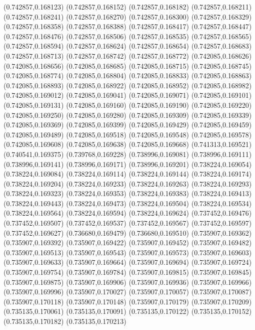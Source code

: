 (0.742857,0.168123)
(0.742857,0.168152)
(0.742857,0.168182)
(0.742857,0.168211)
(0.742857,0.168241)
(0.742857,0.168270)
(0.742857,0.168300)
(0.742857,0.168329)
(0.742857,0.168358)
(0.742857,0.168388)
(0.742857,0.168417)
(0.742857,0.168447)
(0.742857,0.168476)
(0.742857,0.168506)
(0.742857,0.168535)
(0.742857,0.168565)
(0.742857,0.168594)
(0.742857,0.168624)
(0.742857,0.168654)
(0.742857,0.168683)
(0.742857,0.168713)
(0.742857,0.168742)
(0.742857,0.168772)
(0.742085,0.168626)
(0.742085,0.168656)
(0.742085,0.168685)
(0.742085,0.168715)
(0.742085,0.168745)
(0.742085,0.168774)
(0.742085,0.168804)
(0.742085,0.168833)
(0.742085,0.168863)
(0.742085,0.168893)
(0.742085,0.168922)
(0.742085,0.168952)
(0.742085,0.168982)
(0.742085,0.169012)
(0.742085,0.169041)
(0.742085,0.169071)
(0.742085,0.169101)
(0.742085,0.169131)
(0.742085,0.169160)
(0.742085,0.169190)
(0.742085,0.169220)
(0.742085,0.169250)
(0.742085,0.169280)
(0.742085,0.169309)
(0.742085,0.169339)
(0.742085,0.169369)
(0.742085,0.169399)
(0.742085,0.169429)
(0.742085,0.169459)
(0.742085,0.169489)
(0.742085,0.169518)
(0.742085,0.169548)
(0.742085,0.169578)
(0.742085,0.169608)
(0.742085,0.169638)
(0.742085,0.169668)
(0.741313,0.169521)
(0.740541,0.169375)
(0.739768,0.169228)
(0.738996,0.169081)
(0.738996,0.169111)
(0.738996,0.169141)
(0.738996,0.169171)
(0.738996,0.169201)
(0.738224,0.169054)
(0.738224,0.169084)
(0.738224,0.169114)
(0.738224,0.169144)
(0.738224,0.169174)
(0.738224,0.169204)
(0.738224,0.169233)
(0.738224,0.169263)
(0.738224,0.169293)
(0.738224,0.169323)
(0.738224,0.169353)
(0.738224,0.169383)
(0.738224,0.169413)
(0.738224,0.169443)
(0.738224,0.169473)
(0.738224,0.169504)
(0.738224,0.169534)
(0.738224,0.169564)
(0.738224,0.169594)
(0.738224,0.169624)
(0.737452,0.169476)
(0.737452,0.169507)
(0.737452,0.169537)
(0.737452,0.169567)
(0.737452,0.169597)
(0.737452,0.169627)
(0.736680,0.169479)
(0.736680,0.169510)
(0.735907,0.169362)
(0.735907,0.169392)
(0.735907,0.169422)
(0.735907,0.169452)
(0.735907,0.169482)
(0.735907,0.169513)
(0.735907,0.169543)
(0.735907,0.169573)
(0.735907,0.169603)
(0.735907,0.169633)
(0.735907,0.169664)
(0.735907,0.169694)
(0.735907,0.169724)
(0.735907,0.169754)
(0.735907,0.169784)
(0.735907,0.169815)
(0.735907,0.169845)
(0.735907,0.169875)
(0.735907,0.169906)
(0.735907,0.169936)
(0.735907,0.169966)
(0.735907,0.169996)
(0.735907,0.170027)
(0.735907,0.170057)
(0.735907,0.170087)
(0.735907,0.170118)
(0.735907,0.170148)
(0.735907,0.170179)
(0.735907,0.170209)
(0.735135,0.170061)
(0.735135,0.170091)
(0.735135,0.170122)
(0.735135,0.170152)
(0.735135,0.170182)
(0.735135,0.170213)
